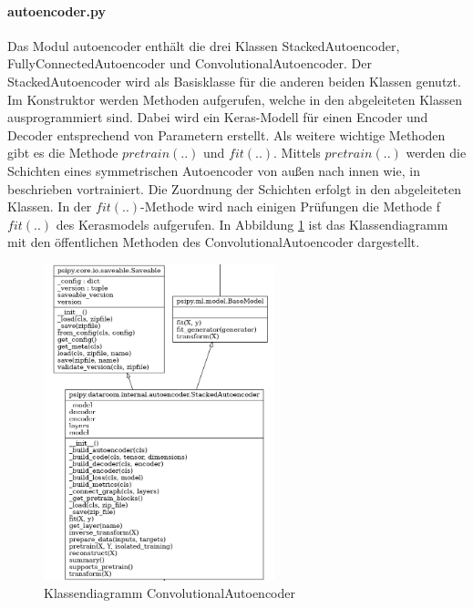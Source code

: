 	\paragraph{autoencoder.py} Das Modul autoencoder enthält die drei Klassen StackedAutoencoder, FullyConnectedAutoencoder und ConvolutionalAutoencoder. Der StackedAutoencoder wird als Basisklasse für die anderen beiden Klassen genutzt. Im Konstruktor werden Methoden aufgerufen, welche in den abgeleiteten Klassen ausprogrammiert sind. Dabei wird ein Keras-Modell für einen Encoder und Decoder entsprechend von Parametern erstellt. Als weitere wichtige Methoden gibt es die Methode $pretrain(..)$ und $fit(..)$. Mittels $pretrain(..)$ werden die Schichten eines symmetrischen Autoencoder von außen nach innen wie, in \cite{Bengio.2007} beschrieben vortrainiert. Die Zuordnung der Schichten erfolgt in den abgeleiteten Klassen.
	In der $fit(..)$-Methode wird nach einigen Prüfungen die Methode f$fit(..)$ \cite{Chollet.2015} des Kerasmodels aufgerufen. In Abbildung \ref{img:KlassendiagrammConvolutionalAutoencoder} ist das Klassendiagramm mit den öffentlichen Methoden des ConvolutionalAutoencoder dargestellt. 
	\begin{figure}[h]
		\centering
		\includegraphics[width=0.6\textwidth, center]{bilder/Klassendiagramme/klassendiagramm_public_cae2.png}
		\caption[Klassendiagramm ConvolutionalAutoencoder]{Klassendiagramm ConvolutionalAutoencoder}
		\label{img:KlassendiagrammConvolutionalAutoencoder}
	\end{figure}  
	
